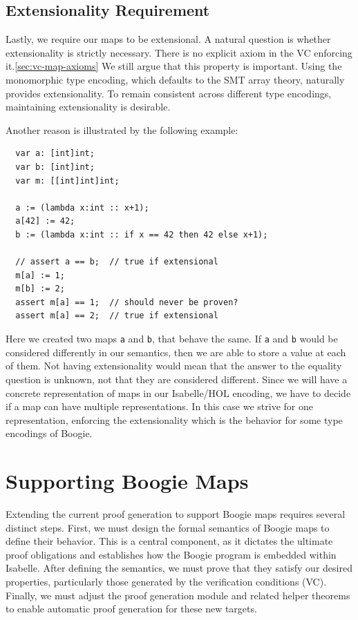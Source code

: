\documentclass[11pt]{article}
\begin{document}
\subsection{Extensionality Requirement}

Lastly, we require our maps to be extensional.
A natural question is whether extensionality is strictly necessary.
There is no explicit axiom in the VC enforcing it.\ref{sec:vc-map-axioms}
We still argue that this property is important.
Using the monomorphic type encoding, which defaults to the SMT array theory,
naturally provides extensionality.
To remain consistent across different type encodings, maintaining extensionality is desirable.

Another reason is illustrated by the following example:
\begin{verbatim}
  var a: [int]int;
  var b: [int]int;
  var m: [[int]int]int;

  a := (lambda x:int :: x+1);
  a[42] := 42;
  b := (lambda x:int :: if x == 42 then 42 else x+1);

  // assert a == b;  // true if extensional
  m[a] := 1;
  m[b] := 2;
  assert m[a] == 1;  // should never be proven?
  assert m[a] == 2;  // true if extensional
\end{verbatim}

Here we created two maps \texttt{a} and \texttt{b}, that behave the same.
If \texttt{a} and \texttt{b} would be considered differently in our semantics,
then we are able to store a value at each of them.
Not having extensionality would mean that the answer to the equality question is unknown,
not that they are considered different.
Since we will have a concrete representation of maps in our Isabelle/HOL encoding,
we have to decide if a map can have multiple representations.
In this case we strive for one representation,
enforcing the extensionality which is the behavior for some type encodings of Boogie.



\section{Supporting Boogie Maps}
\label{sec:support-boogie-maps}

Extending the current proof generation to support Boogie maps requires several distinct steps.
First, we must design the formal semantics of Boogie maps to define their behavior.
This is a central component, as it dictates the ultimate proof obligations and establishes how the Boogie program is embedded within Isabelle.
After defining the semantics, we must prove that they satisfy our desired properties, particularly those generated by the verification conditions (VC).
Finally, we must adjust the proof generation module and related helper theorems to enable automatic proof generation for these new targets.
\end{document}
